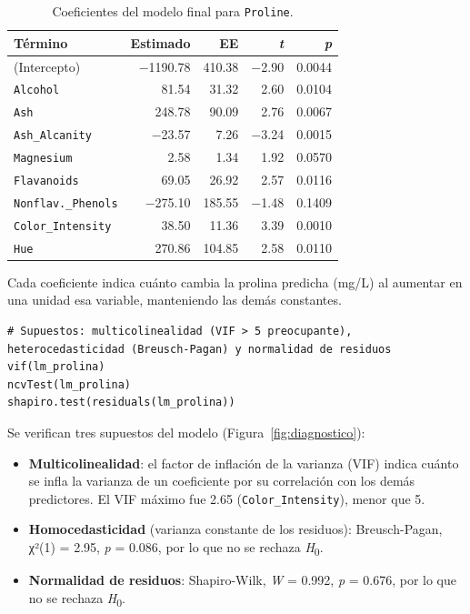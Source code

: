 \documentclass[10pt,letterpaper,twocolumn]{article}
\newcommand{\var}[1]{\texttt{#1}}
\newcommand{\Hcero}{\textit{H}\textsubscript{0}}
\newcommand{\pval}{\textit{p}}
\begin{document}
\begin{table}[htbp]
  \centering
  \caption{Coeficientes del modelo final para \var{Proline}.}
  \label{tab:regresion}
  \footnotesize
  \begin{tabular}{@{}lrrrr@{}}
    \toprule
    \textbf{Término} & \textbf{Estimado} & \textbf{EE} & \textbf{\textit{t}} & \textbf{\textit{p}} \\
    \midrule
    (Intercepto)            & −1190.78 & 410.38 & −2.90 & 0.0044 \\
    \var{Alcohol}           & 81.54    & 31.32  & 2.60  & 0.0104 \\
    \var{Ash}               & 248.78   & 90.09  & 2.76  & 0.0067 \\
    \var{Ash\_Alcanity}     & −23.57   & 7.26   & −3.24 & 0.0015 \\
    \var{Magnesium}         & 2.58     & 1.34   & 1.92  & 0.0570 \\
    \var{Flavanoids}        & 69.05    & 26.92  & 2.57  & 0.0116 \\
    \var{Nonflav.\_Phenols} & −275.10  & 185.55 & −1.48 & 0.1409 \\
    \var{Color\_Intensity}  & 38.50    & 11.36  & 3.39  & 0.0010 \\
    \var{Hue}               & 270.86   & 104.85 & 2.58  & 0.0110 \\
    \bottomrule
  \end{tabular}
\end{table}

Cada coeficiente indica cuánto cambia la prolina predicha (mg/L) al aumentar en una unidad esa variable, manteniendo las demás constantes.

\begin{lstlisting}[firstnumber=570]
# Supuestos: multicolinealidad (VIF > 5 preocupante), heterocedasticidad (Breusch-Pagan) y normalidad de residuos
vif(lm_prolina)
ncvTest(lm_prolina)
shapiro.test(residuals(lm_prolina))
\end{lstlisting}

Se verifican tres supuestos del modelo (Figura~\ref{fig:diagnostico}):
\begin{itemize}
  \item \textbf{Multicolinealidad}: el factor de inflación de la varianza (VIF) indica cuánto se infla la varianza de un coeficiente por su correlación con los demás predictores. El VIF máximo fue 2.65 (\var{Color\_Intensity}), menor que 5.
  \item \textbf{Homocedasticidad} (varianza constante de los residuos): Breusch-Pagan, χ²(1) = 2.95, \pval{} = 0.086, por lo que no se rechaza \Hcero.
  \item \textbf{Normalidad de residuos}: Shapiro-Wilk, \textit{W} = 0.992, \pval{} = 0.676, por lo que no se rechaza \Hcero.
\end{itemize}
\end{document}
